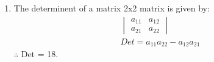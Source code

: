 \renewcommand{\theequation}{\theenumi}
\begin{enumerate}[label=\arabic*.,ref=\thesubsubsection.\theenumi]
\item The determinent of a matrix 2x2 matrix is given by:
\begin{align}
\begin{vmatrix}
a_{11}&a_{12}\\a_{21}&a_{22}
\end{vmatrix}
\\
Det= a_{11}a_{22}-a_{12}a_{21}
\end{align}
$\therefore$ Det = 18.
\end{enumerate}
